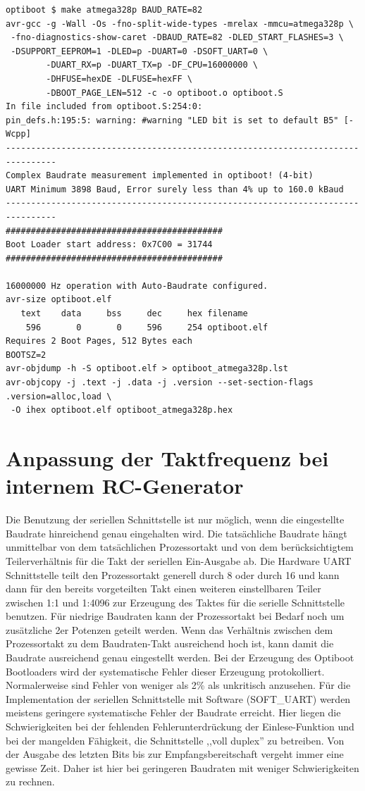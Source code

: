\begin{verbatim}
optiboot $ make atmega328p BAUD_RATE=82
avr-gcc -g -Wall -Os -fno-split-wide-types -mrelax -mmcu=atmega328p \
 -fno-diagnostics-show-caret -DBAUD_RATE=82 -DLED_START_FLASHES=3 \
 -DSUPPORT_EEPROM=1 -DLED=p -DUART=0 -DSOFT_UART=0 \
        -DUART_RX=p -DUART_TX=p -DF_CPU=16000000 \
        -DHFUSE=hexDE -DLFUSE=hexFF \
        -DBOOT_PAGE_LEN=512 -c -o optiboot.o optiboot.S
In file included from optiboot.S:254:0:
pin_defs.h:195:5: warning: #warning "LED bit is set to default B5" [-Wcpp]
--------------------------------------------------------------------------------
Complex Baudrate measurement implemented in optiboot! (4-bit)
UART Minimum 3898 Baud, Error surely less than 4% up to 160.0 kBaud
--------------------------------------------------------------------------------
###########################################
Boot Loader start address: 0x7C00 = 31744
###########################################

16000000 Hz operation with Auto-Baudrate configured.
avr-size optiboot.elf
   text	   data	    bss	    dec	    hex	filename
    596	      0	      0	    596	    254	optiboot.elf
Requires 2 Boot Pages, 512 Bytes each
BOOTSZ=2
avr-objdump -h -S optiboot.elf > optiboot_atmega328p.lst
avr-objcopy -j .text -j .data -j .version --set-section-flags .version=alloc,load \
 -O ihex optiboot.elf optiboot_atmega328p.hex
\end{verbatim}


\section{Anpassung der Taktfrequenz bei internem RC-Generator}

Die Benutzung der seriellen Schnittstelle ist nur möglich, wenn die eingestellte Baudrate
hinreichend genau eingehalten wird. Die tatsächliche Baudrate hängt unmittelbar von dem tatsächlichen
Prozessortakt und von dem berücksichtigtem Teilerverhältnis für die Takt der seriellen Ein-Ausgabe ab.
Die Hardware UART Schnittstelle teilt den Prozessortakt generell durch 8 oder durch 16 und kann
dann für den bereits vorgeteilten Takt einen weiteren einstellbaren Teiler zwischen 1:1 und 1:4096  
zur Erzeugung des Taktes für die serielle Schnittstelle benutzen. Für niedrige Baudraten kann der
Prozessortakt bei Bedarf noch um zusätzliche 2er Potenzen geteilt werden.
Wenn das Verhältnis zwischen dem Prozessortakt zu dem Baudraten-Takt ausreichend hoch ist, kann damit
die Baudrate ausreichend genau eingestellt werden. Bei der Erzeugung des Optiboot Bootloaders
wird der systematische Fehler dieser Erzeugung protokolliert.
Normalerweise sind Fehler von weniger als 2\%  als unkritisch anzusehen.
Für die Implementation der seriellen Schnittstelle mit Software (SOFT\_UART) werden meistens geringere
systematische Fehler der Baudrate erreicht. Hier liegen die Schwierigkeiten bei der fehlenden
Fehlerunterdrückung der Einlese-Funktion und bei der mangelden Fähigkeit, die Schnittstelle
,,voll duplex'' zu betreiben. Von der Ausgabe des letzten Bits bis zur Empfangsbereitschaft vergeht immer
eine gewisse Zeit. Daher ist hier bei geringeren Baudraten mit weniger Schwierigkeiten zu rechnen.

